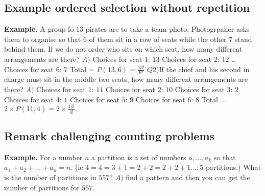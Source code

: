 \documentclass{article}
\begin{document}
\subsection{Example ordered selection without repetition}
\textbf{Example. } A group fo $13$ pirates are to take a team photo. Photogrpaher asks them to 
organise so that $6$ of them sit in a row of seats while the other $7$ stand behind them. If we do not order
who sits on which seat, how many different arrangements are there?
\newline
\newline
$A) $ Choices for seat $1$: $13$
\newline
Choices for seat $2$: $12$
\newline
\dots
\newline
Choices for seat $6$: $7$
\newline
Total = $P(13, 6) = \frac{13!}{6!}$
\newline
\newline
$Q2) $If the chief and his second in charge must sit in the middle two seats, how many different arrangements are there?
\newline
\newline 
$A) $ Choices for seat $1$: $11$
\newline
Choices for seat $2$: $10$
\newline
Choices for seat $3$: $2$
\newline
Choices for seat $4$: $1$
\newline
Choices for seat $5$: $9$
\newline
Choices for seat $6$: $8$
\newline
Total = $ 2 \times P(11, 4) = 2 \times \frac{11!}{4!}.$
\newpage
\subsection{Remark challenging counting problems}
\textbf{Example. } For a number $n$ a partition is a set of numbers $a, \dots, a_k$ so that $a_1 + a_2 + \dots + a_n = n.$ (ie $4 = 4 = 3 + 1 = 2 + 2 = 2 + 2 + 1 \dots; 5$ partitions.)
\newline
What is the number of partitions in $557$?
\newline
\newline
$A) $ find a pattern and then you can get the number of partitions for $557$.
\newpage
\end{document}
